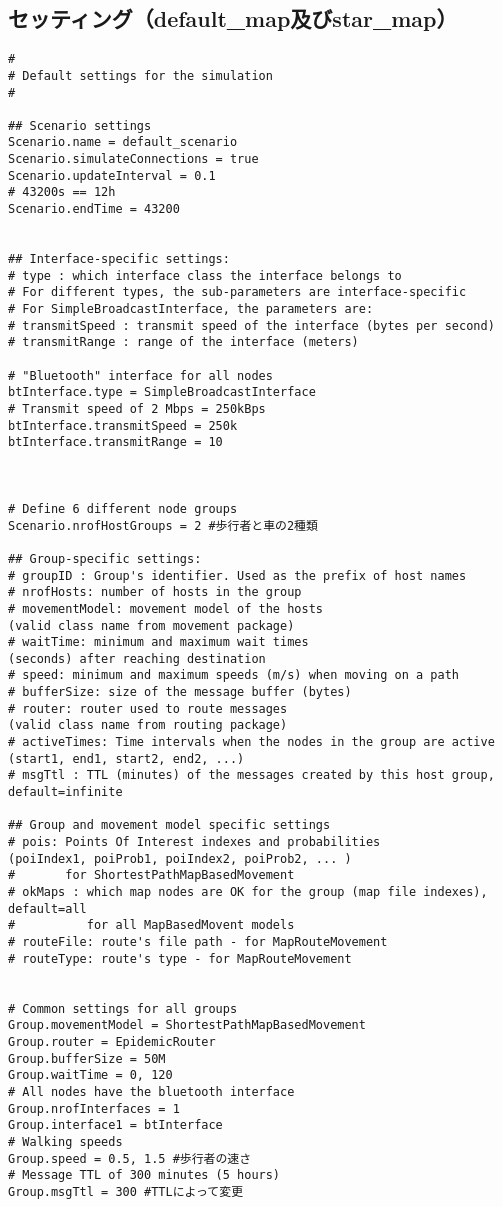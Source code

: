 \documentclass[11pt]{icsthesis}
\begin{document}
\subsection{セッティング（default\_map及びstar\_map）}
\begin{framed}
\begin{verbatim}
#
# Default settings for the simulation
#

## Scenario settings
Scenario.name = default_scenario
Scenario.simulateConnections = true
Scenario.updateInterval = 0.1
# 43200s == 12h
Scenario.endTime = 43200


## Interface-specific settings:
# type : which interface class the interface belongs to
# For different types, the sub-parameters are interface-specific
# For SimpleBroadcastInterface, the parameters are:
# transmitSpeed : transmit speed of the interface (bytes per second) 
# transmitRange : range of the interface (meters)

# "Bluetooth" interface for all nodes
btInterface.type = SimpleBroadcastInterface
# Transmit speed of 2 Mbps = 250kBps
btInterface.transmitSpeed = 250k
btInterface.transmitRange = 10



# Define 6 different node groups
Scenario.nrofHostGroups = 2 #歩行者と車の2種類

## Group-specific settings:
# groupID : Group's identifier. Used as the prefix of host names
# nrofHosts: number of hosts in the group
# movementModel: movement model of the hosts 
(valid class name from movement package)
# waitTime: minimum and maximum wait times 
(seconds) after reaching destination
# speed: minimum and maximum speeds (m/s) when moving on a path
# bufferSize: size of the message buffer (bytes)
# router: router used to route messages 
(valid class name from routing package)
# activeTimes: Time intervals when the nodes in the group are active 
(start1, end1, start2, end2, ...)
# msgTtl : TTL (minutes) of the messages created by this host group, 
default=infinite

## Group and movement model specific settings
# pois: Points Of Interest indexes and probabilities 
(poiIndex1, poiProb1, poiIndex2, poiProb2, ... )
#       for ShortestPathMapBasedMovement
# okMaps : which map nodes are OK for the group (map file indexes), 
default=all 
#          for all MapBasedMovent models
# routeFile: route's file path - for MapRouteMovement
# routeType: route's type - for MapRouteMovement


# Common settings for all groups
Group.movementModel = ShortestPathMapBasedMovement
Group.router = EpidemicRouter
Group.bufferSize = 50M
Group.waitTime = 0, 120
# All nodes have the bluetooth interface
Group.nrofInterfaces = 1
Group.interface1 = btInterface
# Walking speeds
Group.speed = 0.5, 1.5 #歩行者の速さ
# Message TTL of 300 minutes (5 hours)
Group.msgTtl = 300 #TTLによって変更


\end{verbatim}
\end{framed}
\end{document}
